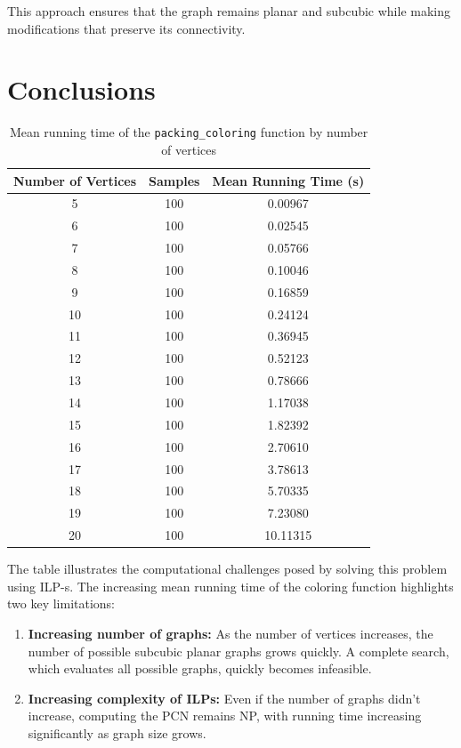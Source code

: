 \documentclass[12pt,a4paper]{amsart}
\theoremstyle{definition}
\theoremstyle{plain}
\begin{document}
This approach ensures that the graph remains planar and subcubic while making modifications that preserve its connectivity.


\section{Conclusions}

\begin{table}[h]
    \centering
    \begin{tabular}{ccc}
        \toprule
        \textbf{Number of Vertices} & \textbf{Samples} & \textbf{Mean Running Time (s)} \\
        \midrule
        5  & 100 & 0.00967 \\
        6  & 100 & 0.02545 \\
        7  & 100 & 0.05766 \\
        8  & 100 & 0.10046 \\
        9  & 100 & 0.16859 \\
        10 & 100 & 0.24124 \\
        11 & 100 & 0.36945 \\
        12 & 100 & 0.52123 \\
        13 & 100 & 0.78666 \\
        14 & 100 & 1.17038 \\
        15 & 100 & 1.82392 \\
        16 & 100 & 2.70610 \\
        17 & 100 & 3.78613 \\
        18 & 100 & 5.70335 \\
        19 & 100 & 7.23080 \\
        20 & 100 & 10.11315 \\
        \bottomrule
    \end{tabular}
    \caption{Mean running time of the \texttt{packing\_coloring} function by number of vertices}
    \label{tab:coloring_time}
\end{table}

The table illustrates the computational challenges posed by solving this problem using ILP-s. The increasing mean running time of the coloring function highlights two key limitations:

\begin{enumerate}
    \item \textbf{Increasing number of graphs:}  
    As the number of vertices increases, the number of possible subcubic planar graphs grows quickly. A complete search, which evaluates all possible graphs, quickly becomes infeasible.

    \item \textbf{Increasing complexity of ILPs:}  
    Even if the number of graphs didn't increase, computing the PCN remains NP, with running time increasing significantly as graph size grows.
\end{enumerate}
\end{document}

